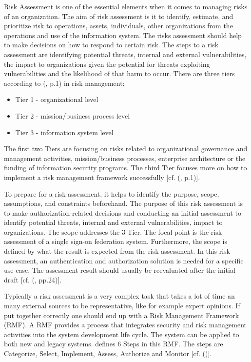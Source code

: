 Risk Assessment is one of the essential elements when it comes to managing risks of an organization. The aim of risk assessment is it to identify, estimate, and prioritize risk to operations, assets, individuals, other organizations from the operations and use of the information system. The risks assessment should help to make decisions on how to respond to certain risk. The steps to a risk assessment are identifying potential threats, internal and external vulnerabilities, the impact to organizations given the potential for threats exploiting vulnerabilities and the likelihood of that harm to occur. There are three tiers according to (\cite{NIST:2012:GCRA}, p.1) in risk management:

\begin{itemize}
	\item Tier 1 - organizational level
	\item Tier 2 - mission/business process level
	\item Tier 3 - information system level
\end{itemize}

The first two Tiers are focusing on risks related to organizational governance and management activities, mission/business processes, enterprise architecture or the funding of information security programs. The third Tier focuses more on how to implement a risk management framework successfully [cf. (\cite{NIST:2012:GCRA}, p.1)]. 

To prepare for a risk assessment, it helps to identify the purpose, scope, assumptions, and constraints beforehand. The purpose of this risk assessment is to make authorization-related decisions and conducting an initial assessment to identify potential threats, internal and external vulnerabilities, impact to organizations. The scope addresses the 3 Tier. The focal point is the risk assessment of a single sign-on federation system. Furthermore, the scope is defined by what the result is expected from the risk assessment. In this risk assessment, an authentication and authorization solution is needed for a specific use case. The assessment result should usually be reevaluated after the initial draft [cf. (\cite{NIST:2012:GCRA}, pp.24)].

Typically a risk assessment is a very complex task that takes a lot of time an many external sources to be representative, like for example expert opinions. If put together correctly one should end up with a Risk Management Framework (RMF). A RMF provides a process that integrates security and risk management activities into the system development life cycle. The system can be applied to both new and legacy systems. \cite{NIST:2018:RMF} defines 6 Steps in this RMF. The steps are Categorize, Select, Implement, Assess, Authorize and Monitor [cf. (\cite{NIST:2018:RMF})]. 

